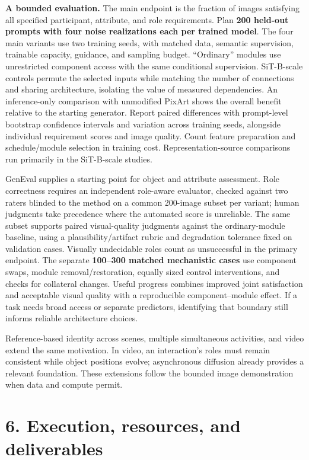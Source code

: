 \documentclass[11pt,letterpaper]{article}
\begin{document}
\textbf{A bounded evaluation.} The main endpoint is the fraction of images satisfying all specified participant, attribute, and role requirements. Plan \textbf{200 held-out prompts with four noise realizations each per trained model}. The four main variants use two training seeds, with matched data, semantic supervision, trainable capacity, guidance, and sampling budget. ``Ordinary'' modules use unrestricted component access with the same conditional supervision. SiT-B-scale controls permute the selected inputs while matching the number of connections and sharing architecture, isolating the value of measured dependencies. An inference-only comparison with unmodified PixArt shows the overall benefit relative to the starting generator. Report paired differences with prompt-level bootstrap confidence intervals and variation across training seeds, alongside individual requirement scores and image quality. Count feature preparation and schedule/module selection in training cost. Representation-source comparisons run primarily in the SiT-B-scale studies.

GenEval \citep{geneval} supplies a starting point for object and attribute assessment. Role correctness requires an independent role-aware evaluator, checked against two raters blinded to the method on a common 200-image subset per variant; human judgments take precedence where the automated score is unreliable. The same subset supports paired visual-quality judgments against the ordinary-module baseline, using a plausibility/artifact rubric and degradation tolerance fixed on validation cases. Visually undecidable roles count as unsuccessful in the primary endpoint. The separate \textbf{100--300 matched mechanistic cases} use component swaps, module removal/restoration, equally sized control interventions, and checks for collateral changes. Useful progress combines improved joint satisfaction and acceptable visual quality with a reproducible component--module effect. If a task needs broad access or separate predictors, identifying that boundary still informs reliable architecture choices.

Reference-based identity across scenes, multiple simultaneous activities, and video extend the same motivation. In video, an interaction's roles must remain consistent while object positions evolve; asynchronous diffusion already provides a relevant foundation. These extensions follow the bounded image demonstration when data and compute permit.

\hypertarget{execution-resources-and-deliverables}{%
\section{6. Execution, resources, and deliverables}\label{execution-resources-and-deliverables}}
\end{document}
